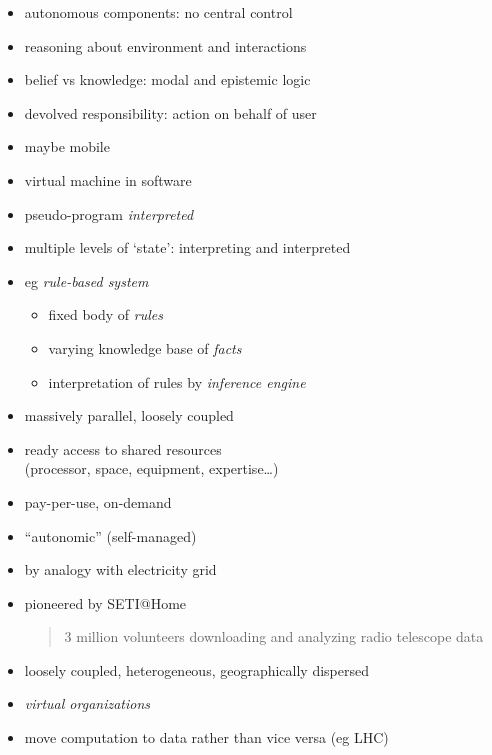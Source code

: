 \documentclass{sepslide-soa-faked} %
\begin{document}
\begin{slide}
\begin{itemize}
\item autonomous components: no central control
\item reasoning about environment and interactions
\item belief vs knowledge: modal and epistemic logic
\item devolved responsibility: action on behalf of user
\item maybe mobile
\end{itemize}
\end{slide}

\begin{slide}
\begin{itemize}
\item virtual machine in software
\item pseudo-program \emph{interpreted}
\item multiple levels of `state': interpreting and interpreted
\item eg \emph{rule-based system}
\begin{itemize}
\item fixed body of \emph{rules}
\item varying knowledge base of \emph{facts}
\item interpretation of rules by \emph{inference engine}
\end{itemize}
\end{itemize}
\end{slide}

\begin{slide}
\begin{itemize}
\item massively parallel, loosely coupled
\item ready access to shared resources \\
  (processor, space, equipment, expertise\ldots)
\item pay-per-use, on-demand
\item ``autonomic'' (self-managed)
\end{itemize}
\end{slide}

\begin{slide}
\begin{itemize}
\item by analogy with electricity grid
\item pioneered by SETI@Home
\begin{quote}
3 million volunteers downloading and analyzing radio telescope data
\end{quote}
\item loosely coupled, heterogeneous, geographically dispersed
\item \emph{virtual organizations}
\item move computation to data rather than vice versa (eg LHC)
\end{itemize}
\end{slide}
\end{document}
